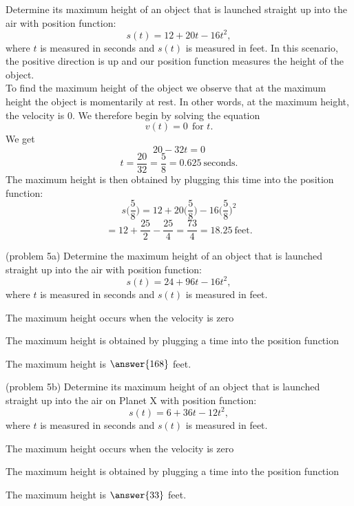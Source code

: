 \documentclass{ximera}
\begin{document}
\begin{example}[example 5]
Determine its maximum height
of an object that is launched straight up into the air with position function:
\[s(t) = 12 + 20t - 16t^2,\]
where $t$ is measured in seconds and $s(t)$ is measured in feet. 
In this scenario, the positive direction is up and our position function measures the height of the object.\\
To find the maximum height of the object we observe that at the maximum height the object is momentarily at rest. 
In other words, at the maximum height, the velocity is 0. We therefore begin by solving the equation
\[v(t) = 0  \  \ \text{for $t$.}\]
 We get 
\[20-32t = 0\]
\[t = \frac{20}{32} = \frac{5}{8} = 0.625 \ \text{seconds}.\]
The maximum height is then obtained by plugging this time into the position function:
\[s\Big(\frac{5}{8}\Big) = 12 + 20\Big(\frac{5}{8}\Big) - 16\Big(\frac{5}{8}\Big)^2 \]
\[= 12 + \frac{25}{2} - \frac{25}{4} = \frac{73}{4} = 18.25\  \text{feet}. \]
\end{example}


\begin{problem}(problem 5a)
Determine the maximum height
of an object that is launched straight up into the air with position function:
\[s(t) = 24 + 96t - 16t^2,\]
where $t$ is measured in seconds and $s(t)$ is measured in feet. 

\begin{hint}
The maximum height occurs when the velocity is zero
\end{hint}
\begin{hint}
The maximum height is obtained by plugging a time into the position function
\end{hint}

The maximum height is $\answer{168}$ feet.

\end{problem}


\begin{problem}(problem 5b)
Determine its maximum height
of an object that is launched straight up into the air on Planet X with position function:
\[s(t) = 6 + 36t - 12t^2,\]
where $t$ is measured in seconds and $s(t)$ is measured in feet. 

\begin{hint}
The maximum height occurs when the velocity is zero
\end{hint}
\begin{hint}
The maximum height is obtained by plugging a time into the position function
\end{hint}

The maximum height is $\answer{33}$ feet.

\end{problem}
 
\end{document}
